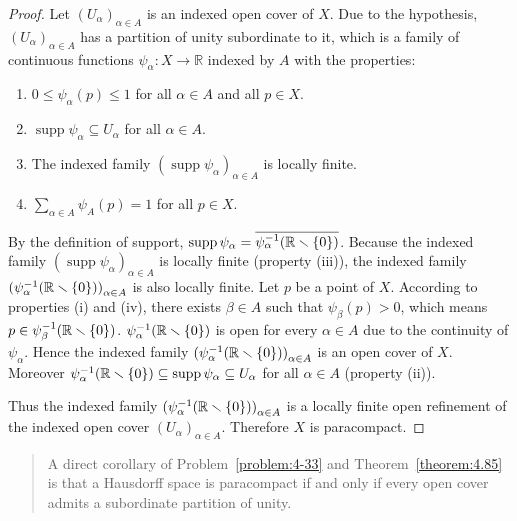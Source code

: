 \begin{proof}
	Let ${(U_{\alpha})}_{\alpha\in A}$ is an indexed open cover of $X$. Due to the hypothesis, ${(U_{\alpha})}_{\alpha\in A}$ has a partition of unity subordinate to it, which is a family of continuous functions $\psi_{\alpha}: X\to \mathbb{R}$ indexed by $A$ with the properties:
	\begin{enumerate}[label={(\arabic*)},itemsep=0pt]
		\item $0 \leq \psi_{\alpha}(p) \leq 1$ for all $\alpha\in A$ and all $p\in X$.
		\item $\operatorname{supp} \psi_{\alpha} \subseteq U_{\alpha}$ for all $\alpha\in A$.
		\item The indexed family ${(\operatorname{supp} \psi_{\alpha})}_{\alpha\in A}$ is locally finite.
		\item $\sum_{\alpha\in A}\psi_{A}(p) = 1$ for all $p\in X$.
	\end{enumerate}

	By the definition of support, $\operatorname{supp} \psi_{\alpha} = \overline{\psi_{\alpha}^{-1}(\mathbb{R}\smallsetminus \left\{{0}\right\})}$. Because the indexed family ${(\operatorname{supp} \psi_{\alpha})}_{\alpha\in A}$ is locally finite (property (iii)), the indexed family ${(\psi_{\alpha}^{-1}(\mathbb{R}\smallsetminus \left\{{0}\right\}))}_{\alpha\in A}$ is also locally finite. Let $p$ be a point of $X$. According to properties (i) and (iv), there exists $\beta\in A$ such that $\psi_{\beta}(p) > 0$, which means $p \in \psi_{\beta}^{-1}(\mathbb{R}\smallsetminus \left\{{0}\right\})$. $\psi_{\alpha}^{-1}(\mathbb{R}\smallsetminus \left\{{0}\right\})$ is open for every $\alpha\in A$ due to the continuity of $\psi_{\alpha}$. Hence the indexed family ${(\psi_{\alpha}^{-1}(\mathbb{R}\smallsetminus \left\{{0}\right\}))}_{\alpha\in A}$ is an open cover of $X$. Moreover $\psi_{\alpha}^{-1}(\mathbb{R}\smallsetminus \left\{{0}\right\}) \subseteq \operatorname{supp}\psi_{\alpha} \subseteq U_{\alpha}$ for all $\alpha\in A$ (property (ii)).

	Thus the indexed family ${(\psi_{\alpha}^{-1}(\mathbb{R}\smallsetminus \left\{{0}\right\}))}_{\alpha\in A}$ is a locally finite open refinement of the indexed open cover ${(U_{\alpha})}_{\alpha\in A}$. Therefore $X$ is paracompact.
\end{proof}

\begin{quotation}
	A direct corollary of Problem~\ref{problem:4-33} and Theorem~\ref{theorem:4.85} is that a Hausdorff space is paracompact if and only if every open cover admits a subordinate partition of unity.
\end{quotation}

